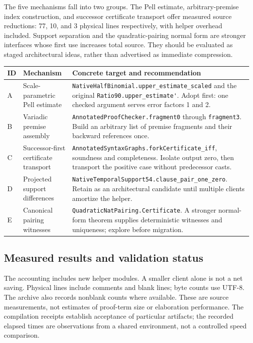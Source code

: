 \documentclass[11pt]{article}
\theoremstyle{remark}\newtheorem{remark}[proposition]{Remark}
\newcommand{\code}[1]{\nolinkurl{#1}}
\begin{document}
The five mechanisms fall into two groups. The Pell estimate, arbitrary-premise index construction, and successor certificate transport offer measured source reductions: 77, 10, and 3 physical lines respectively, with helper overhead included. Support separation and the quadratic-pairing normal form are stronger interfaces whose first use increases total source. They should be evaluated as staged architectural ideas, rather than advertised as immediate compression.

\begin{longtable}{P{.06\textwidth}P{.31\textwidth}P{.53\textwidth}}
\toprule
ID & Mechanism & Concrete target and recommendation\\\midrule\endhead
A & Scale-parametric Pell estimate & \code{NativeHalfBinomial.upper_estimate_scaled} and the original \code{Ratio90.upper_estimate'}. Adopt first: one checked argument serves error factors 1 and 2.\\
B & Variadic premise assembly & \code{AnnotatedProofChecker.fragment0} through \code{fragment3}. Build an arbitrary list of premise fragments and their backward references once.\\
C & Successor-first certificate transport & \code{AnnotatedSyntaxGraphs.forkCertificate_iff}, soundness and completeness. Isolate output zero, then transport the positive case without predecessor casts.\\
D & Projected support differences & \code{NativeTemporalSupport54.clause_pair_one_zero}. Retain as an architectural candidate until multiple clients amortize the helper.\\
E & Canonical pairing witnesses & \code{QuadraticNatPairing.Certificate}. A stronger normal-form theorem supplies deterministic witnesses and uniqueness; explore before migration.\\
\bottomrule
\end{longtable}

\subsection{Measured results and validation status}

\ResultTable

The accounting includes new helper modules. A smaller client alone is not a net saving. Physical lines include comments and blank lines; byte counts use UTF-8. The archive also records nonblank counts where available. These are source measurements, not estimates of proof-term size or elaboration performance. The compilation receipts establish acceptance of particular artifacts; the recorded elapsed times are observations from a shared environment, not a controlled speed comparison.
\end{document}
